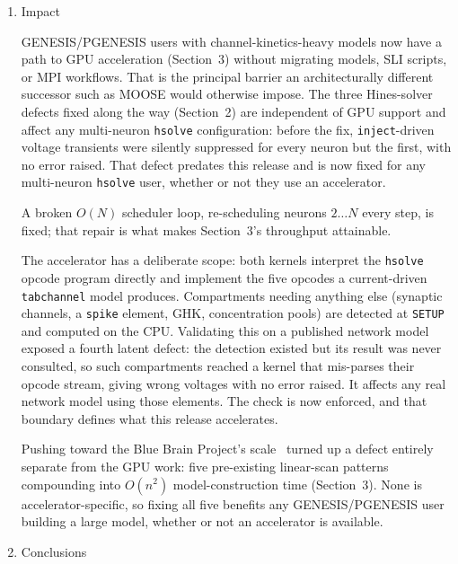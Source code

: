 \documentclass[preprint,12pt, a4paper]{elsarticle}
\begin{document}
\begin{enumerate}
A reproduction pack is included:  re-measures every claim here, regenerates the figures from those measurements, and prints each published value beside the reader's own. Raw data and full steps: .

\item Impact

GENESIS/PGENESIS users with channel-kinetics-heavy models now have a path to GPU acceleration (Section~3) without migrating models, SLI scripts, or MPI workflows. That is the principal barrier an architecturally different successor such as MOOSE would otherwise impose. The three Hines-solver defects fixed along the way (Section~2) are independent of GPU support and affect any multi-neuron \texttt{hsolve} configuration: before the fix, \texttt{inject}-driven voltage transients were silently suppressed for every neuron but the first, with no error raised. That defect predates this release and is now fixed for any multi-neuron \texttt{hsolve} user, whether or not they use an accelerator.

A broken $O(N)$ scheduler loop, re-scheduling neurons $2\ldots N$ every step, is fixed; that repair is what makes Section~3's throughput attainable.

The accelerator has a deliberate scope: both kernels interpret the \texttt{hsolve} opcode program directly and implement the five opcodes a current-driven \texttt{tabchannel} model produces. Compartments needing anything else (synaptic channels, a \texttt{spike} element, GHK, concentration pools) are detected at \texttt{SETUP} and computed on the CPU. Validating this on a published network model exposed a fourth latent defect: the detection existed but its result was never consulted, so such compartments reached a kernel that mis-parses their opcode stream, giving wrong voltages with no error raised. It affects any real network model using those elements. The check is now enforced, and that boundary defines what this release accelerates.

Pushing toward the Blue Brain Project's scale~\cite{markram2015reconstruction} turned up a defect entirely separate from the GPU work: five pre-existing linear-scan patterns compounding into $O(n^2)$ model-construction time (Section~3). None is accelerator-specific, so fixing all five benefits any GENESIS/PGENESIS user building a large model, whether or not an accelerator is available.


\item Conclusions


\end{enumerate}
\end{document}

